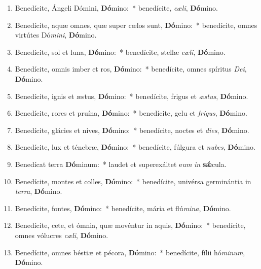 \documentclass[twoside]{article}
\begin{document}
\begin{paracol}[1]{2}
\begin{enumerate}[wide, itemsep=0mm, labelwidth=!, labelindent=0pt, label=\color{gregoriocolor}\theenumi]
\item Benedícite, Ángeli Dómini, \textbf{Dó}mino:~* benedícite, \textit{cæ}\textit{li}, \textbf{Dó}mino.

\item Benedícite, aquæ omnes, quæ super cælos sunt, \textbf{Dó}mino:~* benedícite, omnes virtútes Dó\textit{mi}\textit{ni}, \textbf{Dó}mino.

\item Benedícite, sol et luna, \textbf{Dó}mino:~* benedícite, stellæ \textit{cæ}\textit{li}, \textbf{Dó}mino.

\item Benedícite, omnis imber et ros, \textbf{Dó}mino:~* benedícite, omnes spíritus \textit{De}\textit{i}, \textbf{Dó}mino.

\item Benedícite, ignis et æstus, \textbf{Dó}mino:~* benedícite, frigus et \textit{æs}\textit{tus}, \textbf{Dó}mino.

\item Benedícite, rores et pruína, \textbf{Dó}mino:~* benedícite, gelu et \textit{fri}\textit{gus}, \textbf{Dó}mino.

\item Benedícite, glácies et nives, \textbf{Dó}mino:~* benedícite, noctes et \textit{di}\textit{es}, \textbf{Dó}mino.

\item Benedícite, lux et ténebræ, \textbf{Dó}mino:~* benedícite, fúlgura et \textit{nu}\textit{bes}, \textbf{Dó}mino.

\item Benedícat terra \textbf{Dó}minum:~* laudet et superexáltet e\textit{um} \textit{in} \textbf{sǽ}cula.

\item Benedícite, montes et colles, \textbf{Dó}mino:~* benedícite, univérsa germinántia in \textit{ter}\textit{ra}, \textbf{Dó}mino.

\item Benedícite, fontes, \textbf{Dó}mino:~* benedícite, mária et flú\textit{mi}\textit{na}, \textbf{Dó}mino.

\item Benedícite, cete, et ómnia, quæ movéntur in aquis, \textbf{Dó}mino:~* benedícite, omnes vólucres \textit{cæ}\textit{li}, \textbf{Dó}mino.

\item Benedícite, omnes béstiæ et pécora, \textbf{Dó}mino:~* benedícite, fílii hó\textit{mi}\textit{num}, \textbf{Dó}mino.


\end{enumerate}
\end{paracol}
\end{document}

